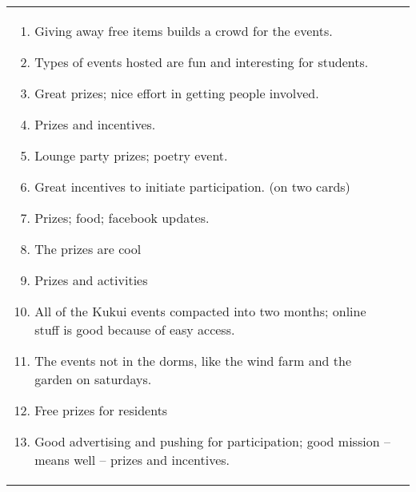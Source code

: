 \documentclass[]{article}
\begin{document}
\begin{figure*}[th!]
\begin{tabular}{|l|l|}
\begin{minipage}[t]{2.6in}
\begin{enumerate}
\item 	Giving away free items builds a crowd for the events. 
\item 	Types of events hosted are fun and interesting for students.
\item 	Great prizes; nice effort in getting people involved.
\item 	Prizes and incentives.
\item 	Lounge party prizes; poetry event.
\item 	Great incentives to initiate participation. (on two cards)
\item 	Prizes; food; facebook updates.
\item 	The prizes are cool
\item 	Prizes and activities
\item 	All of the Kukui events compacted into two months; online stuff is good because of easy access.
\item 	The events not in the dorms, like the wind farm and the garden on saturdays.
\item 	Free prizes for residents
\item 	Good advertising and pushing for participation; good mission -- means well -- prizes and incentives. 
\end{enumerate}
\end{minipage}  \normalsize

&


\end{tabular}
\end{figure*}
\end{document}
